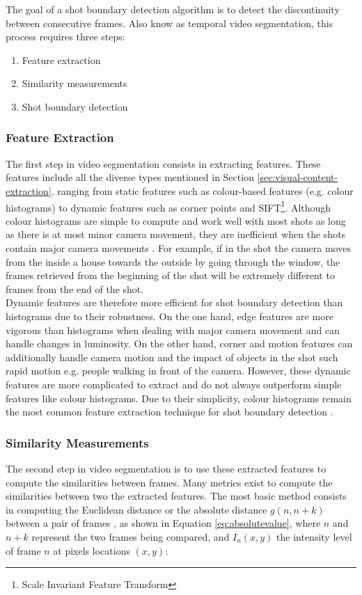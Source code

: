The goal of a shot boundary detection algorithm is to detect the discontinuity between consecutive frames. Also know as temporal video segmentation, this process requires three steps:
\begin{enumerate}
    \item Feature extraction
    \item Similarity measurements
    \item Shot boundary detection
\end{enumerate}

\subsubsection{Feature Extraction}
\label{sec:feature-extraction-sbd}
The first step in video segmentation consists in extracting features. These features include all the diverse types mentioned in Section \ref{sec:visual-content-extraction}, ranging from static features such as colour-based features (e.g. colour histograms) \cite{hoi2006trecvid06} to dynamic features such as corner points and SIFT\footnote{Scale Invariant Feature Transform}. Although colour histograms are simple to compute and work well with most shots as long as there is at most minor camera movement, they are inefficient when the shots contain major camera movements \cite{hu2011survey}. For example, if in the shot the camera moves from the inside a house towards the outside by going through the window, the frames retrieved from the beginning of the shot will be extremely different to frames from the end of the shot.\\

Dynamic features are therefore more efficient for shot boundary detection than histograms due to their robustness. On the one hand, edge features are more vigorous than histograms when dealing with major camera movement and can handle changes in luminosity. On the other hand, corner and motion features can additionally handle camera motion and the impact of objects in the shot such rapid motion e.g. people walking in front of the camera. However, these dynamic features are more complicated to extract and do not always outperform simple features like colour histograms. Due to their simplicity, colour histograms remain the most common feature extraction technique for shot boundary detection \cite{yuan2007shotboundary}.\\

\subsubsection{Similarity Measurements}
\label{sec:similarity-measurements-sbd}
The second step in video segmentation is to use these extracted features to compute the similarities between frames. Many metrics exist to compute the similarities between two the extracted features. The most basic method consists in computing the Euclidean distance or the absolute distance $g(n,n+k)$ between a pair of frames \cite[p.476]{janwe2013video}, as shown in Equation \ref{eq:absolutevalue}, where $n$ and $n+k$ represent the two frames being compared, and $I_n(x,y)$ the intensity level of frame $n$ at pixels locations $(x,y)$:

